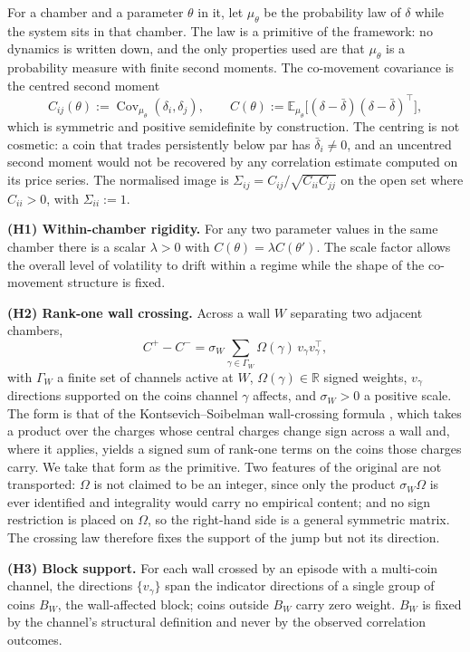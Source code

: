 For a chamber and a parameter $\theta$ in it, let $\mu_\theta$ be the probability law of $\delta$ while the system sits in that chamber. The law is a primitive of the framework: no dynamics is written down, and the only properties used are that $\mu_\theta$ is a probability measure with finite second moments. The co-movement covariance is the centred second moment
\[
C_{ij}(\theta):=\operatorname{Cov}_{\mu_\theta}(\delta_i,\delta_j),\qquad
C(\theta):=\mathbb{E}_{\mu_\theta}\bigl[(\delta-\bar\delta)(\delta-\bar\delta)^\top\bigr],
\]
which is symmetric and positive semidefinite by construction. The centring is not cosmetic: a coin that trades persistently below par has $\bar\delta_i\ne0$, and an uncentred second moment would not be recovered by any correlation estimate computed on its price series. The normalised image is $\Sigma_{ij}=C_{ij}/\sqrt{C_{ii}C_{jj}}$ on the open set where $C_{ii}>0$, with $\Sigma_{ii}:=1$.

\textbf{(H1) Within-chamber rigidity.} For any two parameter values in the same chamber there is a scalar $\lambda>0$ with $C(\theta)=\lambda C(\theta')$. The scale factor allows the overall level of volatility to drift within a regime while the shape of the co-movement structure is fixed.

\textbf{(H2) Rank-one wall crossing.} Across a wall $W$ separating two adjacent chambers,
\[
C^{+}-C^{-}=\sigma_W\sum_{\gamma\in\Gamma_W}\Omega(\gamma)\,v_\gamma v_\gamma^\top ,
\]
with $\Gamma_W$ a finite set of channels active at $W$, $\Omega(\gamma)\in\mathbb{R}$ signed weights, $v_\gamma$ directions supported on the coins channel $\gamma$ affects, and $\sigma_W>0$ a positive scale. The form is that of the Kontsevich--Soibelman wall-crossing formula \citep{KontsevichSoibelman2008}, which takes a product over the charges whose central charges change sign across a wall and, where it applies, yields a signed sum of rank-one terms on the coins those charges carry. We take that form as the primitive. Two features of the original are not transported: $\Omega$ is not claimed to be an integer, since only the product $\sigma_W\Omega$ is ever identified and integrality would carry no empirical content; and no sign restriction is placed on $\Omega$, so the right-hand side is a general symmetric matrix. The crossing law therefore fixes the support of the jump but not its direction.

\textbf{(H3) Block support.} For each wall crossed by an episode with a multi-coin channel, the directions $\{v_\gamma\}$ span the indicator directions of a single group of coins $B_W$, the wall-affected block; coins outside $B_W$ carry zero weight. $B_W$ is fixed by the channel's structural definition and never by the observed correlation outcomes.

